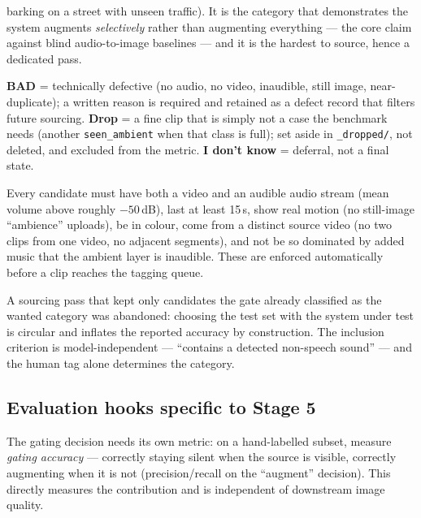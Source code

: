 \documentclass[11pt,a4paper]{article}
\begin{document}
\begin{description}
    barking on a street with unseen traffic). It is the category that demonstrates the system
    augments \emph{selectively} rather than augmenting everything --- the core claim against
    blind audio-to-image baselines --- and it is the hardest to source, hence a dedicated pass.
  \item[Three distinct ways to exclude a clip.] \textbf{BAD} = technically defective (no audio,
    no video, inaudible, still image, near-duplicate); a written reason is required and retained
    as a defect record that filters future sourcing. \textbf{Drop} = a fine clip that is simply
    not a case the benchmark needs (another \texttt{seen\_ambient} when that class is full);
    set aside in \texttt{\_dropped/}, not deleted, and excluded from the metric.
    \textbf{I don't know} = deferral, not a final state.
  \item[Clip admissibility, learned from the BAD tags.] Every candidate must have both a video
    and an audible audio stream (mean volume above roughly $-50$\,dB), last at least 15\,s, show
    real motion (no still-image ``ambience'' uploads), be in colour, come from a distinct source
    video (no two clips from one video, no adjacent segments), and not be so dominated by added
    music that the ambient layer is inaudible. These are enforced automatically before a clip
    reaches the tagging queue.
  \item[Never select benchmark clips by the model's own prediction.] A sourcing pass that kept
    only candidates the gate already classified as the wanted category was abandoned: choosing
    the test set with the system under test is circular and inflates the reported accuracy by
    construction. The inclusion criterion is model-independent --- ``contains a detected
    non-speech sound'' --- and the human tag alone determines the category.
\end{description}

\subsection{Evaluation hooks specific to Stage 5}
The gating decision needs its own metric: on a hand-labelled subset, measure \emph{gating accuracy}
--- correctly staying silent when the source is visible, correctly augmenting when it is not
(precision/recall on the ``augment'' decision). This directly measures the contribution and is
independent of downstream image quality.
\end{document}
